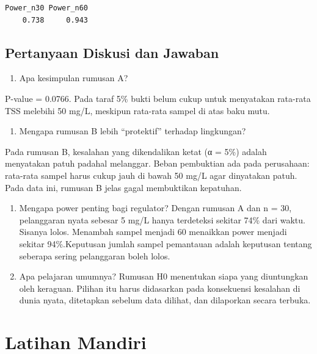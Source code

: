 \documentclass[
  indonesian,
  letterpaper,
]{book}
\providecommand{\tightlist}{%
  \setlength{\itemsep}{0pt}\setlength{\parskip}{0pt}}
\begin{document}
\begin{verbatim}
Power_n30 Power_n60 
    0.738     0.943 
\end{verbatim}

\subsection{Pertanyaan Diskusi dan
Jawaban}\label{pertanyaan-diskusi-dan-jawaban-1}

\begin{enumerate}
\def\labelenumi{\arabic{enumi}.}
\tightlist
\item
  Apa kesimpulan rumusan A?
\end{enumerate}

P-value = 0.0766. Pada taraf 5\% bukti belum cukup untuk menyatakan
rata-rata TSS melebihi 50 mg/L, meskipun rata-rata sampel di atas baku
mutu.

\begin{enumerate}
\def\labelenumi{\arabic{enumi}.}
\setcounter{enumi}{1}
\tightlist
\item
  Mengapa rumusan B lebih ``protektif'' terhadap lingkungan?
\end{enumerate}

Pada rumusan B, kesalahan yang dikendalikan ketat (α = 5\%) adalah
menyatakan patuh padahal melanggar. Beban pembuktian ada pada
perusahaan: rata-rata sampel harus cukup jauh di bawah 50 mg/L agar
dinyatakan patuh. Pada data ini, rumusan B jelas gagal membuktikan
kepatuhan.

\begin{enumerate}
\def\labelenumi{\arabic{enumi}.}
\setcounter{enumi}{2}
\item
  Mengapa power penting bagi regulator? Dengan rumusan A dan n = 30,
  pelanggaran nyata sebesar 5 mg/L hanya terdeteksi sekitar 74\% dari
  waktu. Sisanya lolos. Menambah sampel menjadi 60 menaikkan power
  menjadi sekitar 94\%.Keputusan jumlah sampel pemantauan adalah
  keputusan tentang seberapa sering pelanggaran boleh lolos.
\item
  Apa pelajaran umumnya? Rumusan H0 menentukan siapa yang diuntungkan
  oleh keraguan. Pilihan itu harus didasarkan pada konsekuensi kesalahan
  di dunia nyata, ditetapkan sebelum data dilihat, dan dilaporkan secara
  terbuka.
\end{enumerate}

\section{Latihan Mandiri}\label{latihan-mandiri-1}
\end{document}
